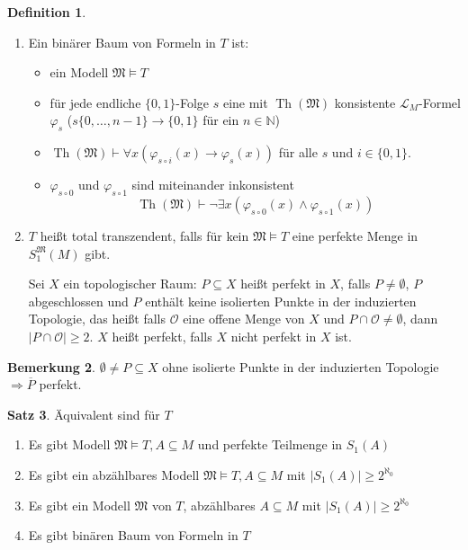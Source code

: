 \documentclass[12pt,parskip=full]{scrartcl}
\newcommand{\setN}{\mathbb{N}}
\newcommand{\abs}[1]{{\left| #1 \right|}}
\theoremstyle{definition}
\newtheorem{theorem}{Satz}[section]
\newtheorem{definition}[theorem]{Definition}
\newtheorem{remark}[theorem]{Bemerkung}
\begin{document}
	\begin{definition}
		\begin{enumerate}
			\item Ein binärer Baum von Formeln in $T$ ist:
			\begin{itemize}
				\item ein Modell $\mathfrak{M} \models T$
				\item für jede endliche $\{ 0,1 \}$-Folge $s$ eine mit $\operatorname{Th}(\mathfrak{M})$ konsistente $\mathcal{L}_M$-Formel $\varphi_s$ ($s \{ 0, \dots, n-1 \} \to \{ 0,1 \}$ für ein $n \in \setN$)
				\item $\operatorname{Th}(\mathfrak{M}) \vdash \forall x (\varphi_{s \circ i}(x) \to \varphi_s(x))$ für alle $s$ und $i \in \{0,1\}$.
				\item $\varphi_{s \circ 0}$ und $\varphi_{s \circ 1}$ sind miteinander inkonsistent
				\begin{equation*}
					\operatorname{Th}(\mathfrak{M}) \vdash \lnot \exists x(\varphi_{s \circ 0}(x) \land \varphi_{s \circ 1}(x) )
				\end{equation*}
			\end{itemize}
			\item $T$ heißt total transzendent, falls für kein $\mathfrak{M} \models T$ eine perfekte Menge in $S_1^\mathfrak{M}(M)$ gibt.
			
			Sei $X$ ein topologischer Raum: $P \subseteq X$ heißt perfekt in $X$, falls $P \neq \emptyset$, $P$ abgeschlossen und $P$ enthält keine isolierten Punkte in der induzierten Topologie, das heißt falls $\mathcal{O}$ eine offene Menge von $X$ und $P \cap \mathcal{O} \neq \emptyset$, dann $\abs{P \cap \mathcal{O}} \geq 2$. $X$ heißt perfekt, falls $X$ nicht perfekt in $X$ ist.
		\end{enumerate}
	\end{definition}

	\begin{remark}
		$\emptyset \neq P \subseteq X$ ohne isolierte Punkte in der induzierten Topologie $\Rightarrow \overline{P}$ perfekt.
	\end{remark}

	\begin{theorem}
		Äquivalent sind für $T$
		\begin{enumerate}
			\item Es gibt Modell $\mathfrak{M} \models T, A \subseteq M$ und perfekte Teilmenge in $S_1(A)$
			\item Es gibt ein abzählbares Modell $\mathfrak{M} \models T, A \subseteq M$ mit $\abs{S_1(A)} \geq 2^{\aleph_0}$
			\item Es gibt ein Modell $\mathfrak{M}$ von $T$, abzählbares $A \subseteq M$ mit $\abs{S_1(A)} \geq 2^{\aleph_0}$
			\item Es gibt binären Baum von Formeln in $T$
		\end{enumerate}
	\end{theorem}
\end{document}
